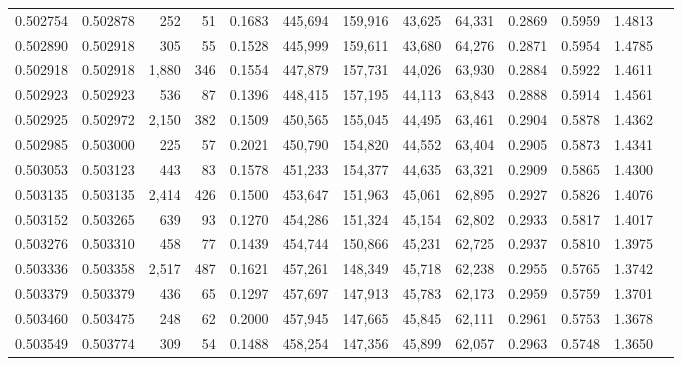 \begin{tabular}{rrrrrrrrrrrrr}
0.502754 & 0.502878 &   252 &    51 &                                     0.1683 & 445,694 & 159,916 &  43,625 &  64,331 & 0.2869 & 0.5959 & 1.4813 \\
0.502890 & 0.502918 &   305 &    55 &                                     0.1528 & 445,999 & 159,611 &  43,680 &  64,276 & 0.2871 & 0.5954 & 1.4785 \\
0.502918 & 0.502918 & 1,880 &   346 &                                     0.1554 & 447,879 & 157,731 &  44,026 &  63,930 & 0.2884 & 0.5922 & 1.4611 \\
0.502923 & 0.502923 &   536 &    87 &                                     0.1396 & 448,415 & 157,195 &  44,113 &  63,843 & 0.2888 & 0.5914 & 1.4561 \\
0.502925 & 0.502972 & 2,150 &   382 &                                     0.1509 & 450,565 & 155,045 &  44,495 &  63,461 & 0.2904 & 0.5878 & 1.4362 \\
0.502985 & 0.503000 &   225 &    57 &                                     0.2021 & 450,790 & 154,820 &  44,552 &  63,404 & 0.2905 & 0.5873 & 1.4341 \\
0.503053 & 0.503123 &   443 &    83 &                                     0.1578 & 451,233 & 154,377 &  44,635 &  63,321 & 0.2909 & 0.5865 & 1.4300 \\
0.503135 & 0.503135 & 2,414 &   426 &                                     0.1500 & 453,647 & 151,963 &  45,061 &  62,895 & 0.2927 & 0.5826 & 1.4076 \\
0.503152 & 0.503265 &   639 &    93 &                                     0.1270 & 454,286 & 151,324 &  45,154 &  62,802 & 0.2933 & 0.5817 & 1.4017 \\
0.503276 & 0.503310 &   458 &    77 &                                     0.1439 & 454,744 & 150,866 &  45,231 &  62,725 & 0.2937 & 0.5810 & 1.3975 \\
0.503336 & 0.503358 & 2,517 &   487 &                                     0.1621 & 457,261 & 148,349 &  45,718 &  62,238 & 0.2955 & 0.5765 & 1.3742 \\
0.503379 & 0.503379 &   436 &    65 &                                     0.1297 & 457,697 & 147,913 &  45,783 &  62,173 & 0.2959 & 0.5759 & 1.3701 \\
0.503460 & 0.503475 &   248 &    62 &                                     0.2000 & 457,945 & 147,665 &  45,845 &  62,111 & 0.2961 & 0.5753 & 1.3678 \\
0.503549 & 0.503774 &   309 &    54 &                                     0.1488 & 458,254 & 147,356 &  45,899 &  62,057 & 0.2963 & 0.5748 & 1.3650 \\

\end{tabular}
